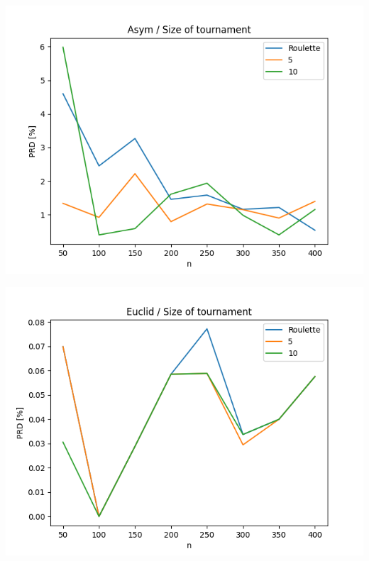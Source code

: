\documentclass{article}
\begin{document}
\begin{center}
\includegraphics[width=\textwidth, 
                   height = 0.4\textheight, 
                   keepaspectratio]
                  {plots/asym_7_tour} 
\end{center}

\begin{center}
\includegraphics[width=\textwidth, 
                   height = 0.4\textheight, 
                   keepaspectratio]
                  {plots/euclid_7_tour} 
\end{center}
\end{document}
